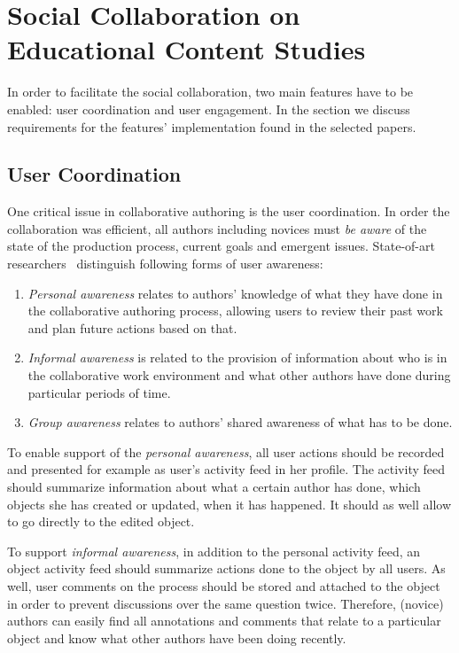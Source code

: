 \documentclass[PhD, Submit, ngerman,UKenglish,table]{scrbook}
\begin{document}
\section{Social Collaboration on Educational Content Studies}

In order to facilitate the social collaboration, two main features have to be enabled: user coordination and user engagement.
In the section we discuss requirements for the features' implementation found in the selected papers. 

\subsection{User Coordination}

One critical issue in collaborative authoring is the user coordination. 
In order the collaboration was efficient, all authors including novices must \emph{be aware} of the state of the production process, current goals and emergent issues.
State-of-art researchers~\cite{Nurjanah2011} distinguish following forms of user awareness: 

\begin{enumerate}
\item \emph{Personal awareness} relates to authors' knowledge of what they have done in the collaborative authoring process, allowing users to review their past work and plan future actions based on that.
\item \emph{Informal awareness} is related to the provision of information about who is in the collaborative work environment and what other authors have done during particular periods of time.
\item \emph{Group awareness} relates to authors' shared awareness of what has to be done.
\end{enumerate} 

To enable support of the \emph{personal awareness}, all user actions should be recorded and presented for example as user's activity feed in her profile.
The activity feed should summarize information about what a certain author has done, which objects she has created or updated, when it has happened. 
It should as well allow to go directly to the edited object.

To support \emph{informal awareness}, in addition to the personal activity feed, an object activity feed should summarize actions done to the object by all users.
As well, user comments on the process should be stored and attached to the object in order to prevent discussions over the same question twice. 
Therefore, (novice) authors can easily find all annotations and comments that relate to a particular object and know what other authors have been doing recently.
\end{document}
